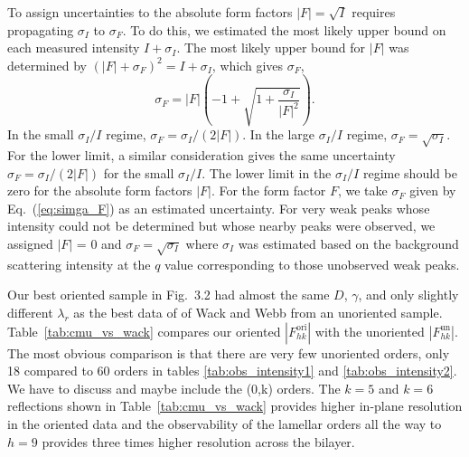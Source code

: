To assign uncertainties to the absolute 
form factors $|F|=\sqrt{I}$ requires propagating $\sigma_I$ to $\sigma_F$.
To do this, we estimated the most likely upper bound on each measured intensity 
$I+\sigma_I$. The most likely upper bound for $|F|$ was determined by
$(|F|+\sigma_F)^2=I+\sigma_I$, which gives $\sigma_F$,
\begin{equation}
\label{eq:simga_F}
  \sigma_F=|F|(-1+\sqrt{1+\frac{\sigma_I}{|F|^2}}).
\end{equation}
In the small $\sigma_I/I$ regime, $\sigma_F=\sigma_I/(2|F|)$. In the 
large $\sigma_I/I$ regime, $\sigma_F=\sqrt{\sigma_I}$. For the lower limit,
a similar consideration gives the same uncertainty $\sigma_F=\sigma_I/(2|F|)$
for the small $\sigma_I/I$. The lower limit in the $\sigma_I/I$ regime
should be zero for the absolute form factors $|F|$. For the form factor $F$,
we take $\sigma_F$ given by Eq.~(\ref{eq:simga_F}) as an estimated 
uncertainty. For very weak peaks whose intensity could not be determined but
whose nearby peaks were observed, we assigned $|F|$ = 0 and 
$\sigma_F = \sqrt{\sigma_I}$ where $\sigma_I$ was estimated based on the
background scattering intensity at the $q$ value corresponding to those
unobserved weak peaks. 

Our best oriented sample in Fig.~3.2 had almost the same $D$, $\gamma$, and 
only slightly different ${\lambda}_r$ as the best data of of Wack and Webb 
\cite{ref:Wack89} from an unoriented sample. 
Table~\ref{tab:cmu_vs_wack} compares our oriented 
$\left|F_{hk}^\text{ori}\right|$ with the unoriented 
$\left|F_{hk}^\text{un}\right|$. The most obvious comparison is that there 
are very few unoriented orders, only 18 compared to 60 orders in tables 
\ref{tab:obs_intensity1} and \ref{tab:obs_intensity2}. 
{\jn We have to discuss and maybe include the (0,k) orders.}  
The $k=5$ and $k=6$ reflections shown in Table~\ref{tab:cmu_vs_wack} provides 
higher in-plane resolution in the oriented data and the observability of the 
lamellar orders all the way to $h=9$ provides three times higher resolution 
across the bilayer.

